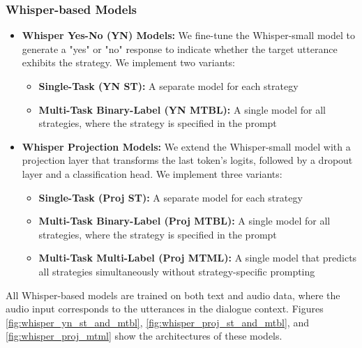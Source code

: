 \documentclass{article}
\begin{document}
\subsubsection{Whisper-based Models}
\begin{itemize}
    \item \textbf{Whisper Yes-No (YN) Models:} We fine-tune the Whisper-small model to generate a "yes" or "no" response to indicate whether the target utterance exhibits the strategy. We implement two variants:
    \begin{itemize}
        \item \textbf{Single-Task (YN ST):} A separate model for each strategy
        \item \textbf{Multi-Task Binary-Label (YN MTBL):} A single model for all strategies, where the strategy is specified in the prompt
    \end{itemize}
    
    \item \textbf{Whisper Projection Models:} We extend the Whisper-small model with a projection layer that transforms the last token's logits, followed by a dropout layer and a classification head. We implement three variants:
    \begin{itemize}
        \item \textbf{Single-Task (Proj ST):} A separate model for each strategy
        \item \textbf{Multi-Task Binary-Label (Proj MTBL):} A single model for all strategies, where the strategy is specified in the prompt
        \item \textbf{Multi-Task Multi-Label (Proj MTML):} A single model that predicts all strategies simultaneously without strategy-specific prompting
    \end{itemize}
\end{itemize}

All Whisper-based models are trained on both text and audio data, where the audio input corresponds to the utterances in the dialogue context. Figures \ref{fig:whisper_yn_st_and_mtbl}, \ref{fig:whisper_proj_st_and_mtbl}, and \ref{fig:whisper_proj_mtml} show the architectures of these models.
\end{document}
